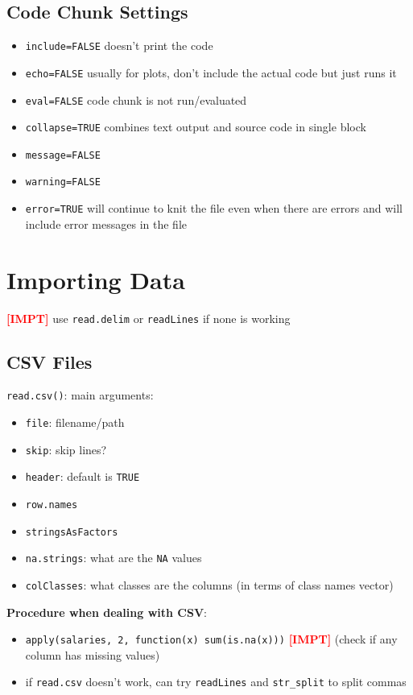 \documentclass{article}
\newcommand{\impt}[0]{\textcolor{red}{\textbf{[IMPT] }}}
\begin{document}
\begin{multicols}{2}
\subsection*{Code Chunk Settings}
\begin{itemize}
	\item \texttt{include=FALSE} doesn't print the code
	\item \texttt{echo=FALSE} usually for plots, don't include the actual code but just runs it
	\item \texttt{eval=FALSE} code chunk is not run/evaluated
	\item \texttt{collapse=TRUE} combines text output and source code in single block
	\item \texttt{message=FALSE}
	\item \texttt{warning=FALSE}
	\item \texttt{error=TRUE} will continue to knit the file even when there are errors and will include error messages in the file
\end{itemize}

\section{Importing Data}

\impt use \texttt{read.delim} or \texttt{readLines} if none is working

\subsection*{CSV Files}
\texttt{read.csv()}: main arguments:
\begin{itemize}
	\item \texttt{file}: filename/path
	\item \texttt{skip}: skip lines?
	\item \texttt{header}: default is \texttt{TRUE}
	\item \texttt{row.names}
	\item \texttt{stringsAsFactors}
	\item \texttt{na.strings}: what are the \texttt{NA} values
	\item \texttt{colClasses}: what classes are the columns (in terms of class names vector)\\
\end{itemize}
\textbf{Procedure when dealing with CSV}:
\begin{itemize}
	\item \texttt{apply(salaries, 2, function(x) sum(is.na(x)))} \impt (check if any column has missing values)
	\item if \texttt{read.csv} doesn't work, can try \texttt{readLines} and \texttt{str\_split} to split commas
\end{itemize}



\end{multicols}
\end{document}
